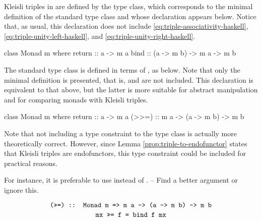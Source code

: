 
Kleisli triples in \hask are defined by the  type
class, which corresponds to the minimal definition of the standard
 type class and whose declaration appears below.
Notice that, as usual, this declaration does not include
\eqref{eq:triple-associativity-haskell},
\eqref{eq:triple-unity-left-haskell}, and
\eqref{eq:triple-unity-right-haskell}.
\begin{codehaskell}
class Monad m where
  return :: a -> m a
  bind   :: (a -> m b) -> m a -> m b
\end{codehaskell}

The standard  type class is defined in terms of
\texthaskell{(>>=)}, as below. Note that only the minimal definition
is presented, that is, \texthaskell{(>>)} and  are
not included. This declaration is equivalent to that above, but the
latter is more suitable for abstract manipulation and for comparing
monads with Kleisli triples.

\begin{codehaskell}
class Monad m where
  return :: a -> m a
  (>>=)  :: m a -> (a -> m b) -> m b
\end{codehaskell}

\begin{remark}
  \label{re:triple-endofunctor}
  Note that not including a  type constraint to
  the  type class is actually more theoretically
  correct. However, since Lemma \ref{prop:triple-to-endofunctor}
  states that Kleisli triples are endofunctors, this type constraint could be
  included for practical reasons.

  For instance, it is preferable to use  instead of
  . -- Find a better argument or ignore this.

\end{remark}

\begin{equation*}
  \text{\texttt{(>>=) :: Monad m => m a -> (a -> m b) -> m b}}
\end{equation*}
\begin{equation}
  \label{eq:triple-to-alternative-bind-haskell}
  \text{\texttt{mx >>= f = bind f mx}}
\end{equation}


